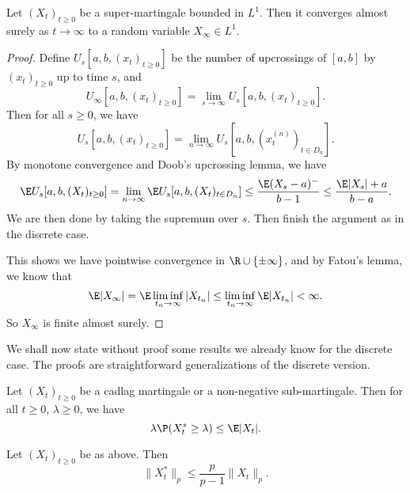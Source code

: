 \documentclass[a4paper]{article}
\begin{document}
\begin{thm}
  Let $(X_t)_{t \geq 0}$ be a super-martingale bounded in $L^1$. Then it converges almost surely as $t \to \infty$ to a random variable $X_\infty \in L^1$.
\end{thm}

\begin{proof}

  Define $U_s[a, b, (x_t)_{t \geq 0}]$ be the number of upcrossings of $[a, b]$ by $(x_t)_{t \geq 0}$ up to time $s$, and
  \[
    U_\infty[a, b, (x_t)_{t \geq 0}] = \lim_{s \to \infty} U_s [a, b, (x_t)_{t \geq 0}].
  \]
  Then for all $s \geq 0$, we have
  \[
    U_s[a, b, (x_t)_{t \geq 0}] = \lim_{n \to \infty} U_s[a, b, (x_t^{(n)})_{t \in D_n}].
  \]
  By monotone convergence and Doob's upcrossing lemma, we have
  \[
    \E U_s[a, b, (X_t)_{t \geq 0}] = \lim_{n \to \infty} \E U_s[a, b, (X_t)_{t \in D_n}] \leq \frac{\E(X_s - a)^-}{b - 1} \leq \frac{\E |X_s| + a}{b - a}. %
  \]
  We are then done by taking the supremum over $s$. Then finish the argument as in the discrete case.

  This shows we have pointwise convergence in $\R \cup \{\pm \infty\}$, and by Fatou's lemma, we know that
  \[
    \E |X_\infty| = \E \liminf_{t_n \to \infty} |X_{t_n}| \leq \liminf_{t_n \to \infty} \E |X_{t_n}| < \infty.
  \]
  So $X_\infty$ is finite almost surely.
\end{proof}

We shall now state without proof some results we already know for the discrete case. The proofs are straightforward generalizations of the discrete version.

\begin{lemma}
  Let $(X_t)_{t \geq 0}$ be a cadlag martingale or a non-negative sub-martingale. Then for all $t \geq 0$, $\lambda \geq 0$, we have
  \[
    \lambda \P (X^*_t \geq \lambda)\leq \E |X_t|.
  \]
\end{lemma}

\begin{lemma}
  Let $(X_t)_{t \geq 0}$ be as above. Then
  \[
    \|X_t^*\|_p \leq \frac{p}{p - 1} \|X_t\|_p.
  \]
\end{lemma}
\end{document}
